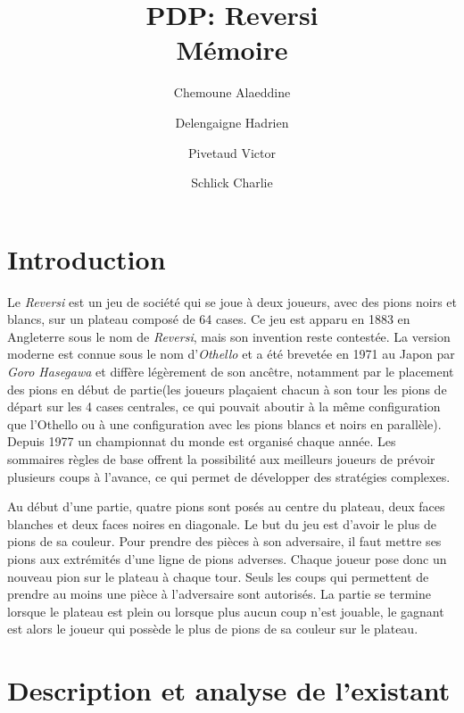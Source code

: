 \documentclass[12pt]{article}
\title{PDP: Reversi\\Mémoire}
\author{
  Chemoune Alaeddine\\ 
  \and
  Delengaigne Hadrien\\
  \and
  Pivetaud Victor\\
  \and
  Schlick Charlie\\
}
\begin{document}
\maketitle

\tableofcontents

\section{Introduction}
Le \textit{Reversi} est un jeu de société qui se joue à deux joueurs, avec des pions noirs et blancs, sur un plateau composé de 64 cases. Ce jeu est apparu en 1883 en Angleterre sous le nom de \textit{Reversi}, mais son invention reste contestée. La version moderne est connue sous le nom d'\textit{Othello} et a été brevetée en 1971 au Japon par \textit{Goro Hasegawa} et diffère légèrement de son ancêtre, notamment par le placement des pions en début de partie\cite{othello}(les joueurs plaçaient chacun à son tour les pions de départ sur les 4 cases centrales, ce qui pouvait aboutir à la même configuration que l'Othello ou à une configuration avec les pions blancs et noirs en parallèle). Depuis 1977 un championnat du monde est organisé chaque année. Les sommaires règles de base offrent la possibilité aux meilleurs joueurs de prévoir plusieurs coups à l'avance, ce qui permet de développer des stratégies complexes. 

Au début d'une partie, quatre pions sont posés au centre du plateau, deux faces blanches et deux faces noires en diagonale. Le but du jeu est d'avoir le plus de pions de sa couleur. Pour prendre des pièces à son adversaire, il faut mettre ses pions aux extrémités d'une ligne de pions adverses. Chaque joueur pose donc un nouveau pion sur le plateau à chaque tour. Seuls les coups qui permettent de prendre au moins une pièce à l'adversaire sont autorisés. La partie se termine lorsque le plateau est plein ou lorsque plus aucun coup n'est jouable, le gagnant est alors le joueur qui possède le plus de pions de sa couleur sur le plateau.

\section{Description et analyse de l'existant}
\end{document}

